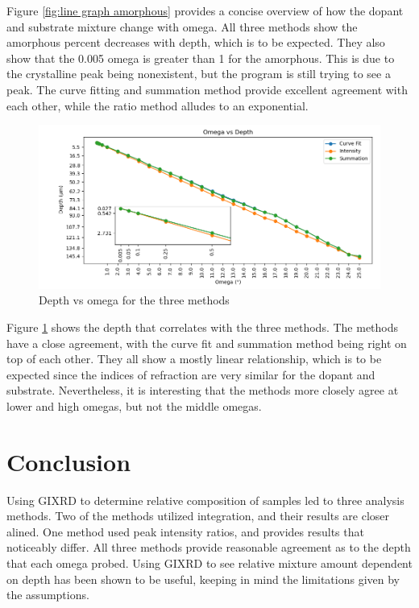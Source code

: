 \documentclass{article}
\begin{document}
\begin{multicols}{2}
    Figure \ref{fig:line graph amorphous} provides a concise overview of how the dopant and substrate mixture change with omega. 
    All three methods show the amorphous percent decreases with depth, which is to be expected. 
    They also show that the 0.005 omega is greater than 1 for the amorphous.
    This is due to the crystalline peak being nonexistent, but the program is still trying to see a peak.
    The curve fitting and summation method provide excellent agreement with each other, while the ratio method alludes to an exponential.
        
    \begin{figure}[H]
        \centering
        \includegraphics[width=1\linewidth]{Depth vs Omega.png}
        \caption{Depth vs omega for the three methods}
        \label{fig:depth vs omega}
    \end{figure}
    
    Figure \ref{fig:depth vs omega} shows the depth that correlates with the three methods. 
    The methods have a close agreement, with the curve fit and summation method being right on top of each other.
    They all show a mostly linear relationship, which is to be expected since the indices of refraction are very similar for the dopant and substrate.
    Nevertheless, it is interesting that the methods more closely agree at lower and high omegas, but not the middle omegas.

\section{Conclusion}

    Using GIXRD to determine relative composition of samples led to three analysis methods. 
    Two of the methods utilized integration, and their results are closer alined. 
    One method used peak intensity ratios, and provides results that noticeably differ. 
    All three methods provide reasonable agreement as to the depth that each omega probed. 
    Using GIXRD to see relative mixture amount dependent on depth has been shown to be useful, keeping in mind the limitations given by the assumptions.


\end{multicols}
\end{document}
